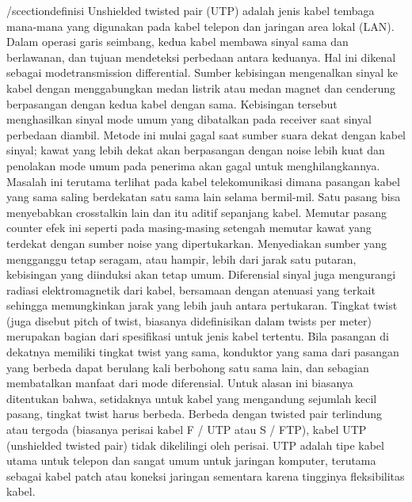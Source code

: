 /scection{definisi}
Unshielded twisted pair (UTP) adalah jenis kabel tembaga mana-mana yang digunakan pada kabel telepon dan jaringan area lokal (LAN).
Dalam operasi garis seimbang, kedua kabel membawa sinyal sama dan berlawanan, dan tujuan mendeteksi perbedaan antara keduanya. Hal ini dikenal sebagai modetransmission differential. Sumber kebisingan mengenalkan sinyal ke kabel dengan menggabungkan medan listrik atau medan magnet dan cenderung berpasangan dengan kedua kabel dengan sama. Kebisingan tersebut menghasilkan sinyal mode umum yang dibatalkan pada receiver saat sinyal perbedaan diambil. Metode ini mulai gagal saat sumber suara dekat dengan kabel sinyal; kawat yang lebih dekat akan berpasangan dengan noise lebih kuat dan penolakan mode umum pada penerima akan gagal untuk menghilangkannya. Masalah ini terutama terlihat pada kabel telekomunikasi dimana pasangan kabel yang sama saling berdekatan satu sama lain selama bermil-mil. Satu pasang bisa menyebabkan crosstalkin lain dan itu aditif sepanjang kabel. Memutar pasang counter efek ini seperti pada masing-masing setengah memutar kawat yang terdekat dengan sumber noise yang dipertukarkan. Menyediakan sumber yang mengganggu tetap seragam, atau hampir, lebih dari jarak satu putaran, kebisingan yang diinduksi akan tetap umum. Diferensial sinyal juga mengurangi radiasi elektromagnetik dari kabel, bersamaan dengan atenuasi yang terkait sehingga memungkinkan jarak yang lebih jauh antara pertukaran. Tingkat twist (juga disebut pitch of twist, biasanya didefinisikan dalam twists per meter) merupakan bagian dari spesifikasi untuk jenis kabel tertentu. Bila pasangan di dekatnya memiliki tingkat twist yang sama, konduktor yang sama dari pasangan yang berbeda dapat berulang kali berbohong satu sama lain, dan sebagian membatalkan manfaat dari mode diferensial. Untuk alasan ini biasanya ditentukan bahwa, setidaknya untuk kabel yang mengandung sejumlah kecil pasang, tingkat twist harus berbeda. Berbeda dengan twisted pair terlindung atau tergoda (biasanya perisai kabel F / UTP atau S / FTP), kabel UTP (unshielded twisted pair) tidak dikelilingi oleh perisai. UTP adalah tipe kabel utama untuk telepon dan sangat umum untuk jaringan komputer, terutama sebagai kabel patch atau koneksi jaringan sementara karena tingginya fleksibilitas kabel.


